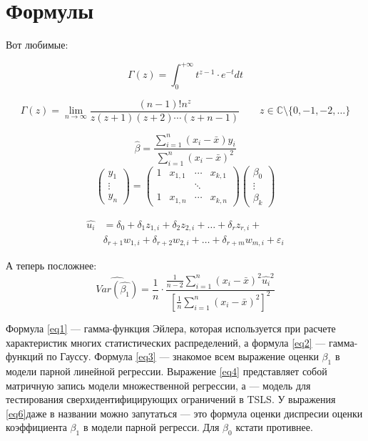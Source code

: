 \documentclass[12pt,a4paper]{article}
\def\C{\ensuremath{\mathbb{C}{}}}
\begin{document}
\section{Формулы}
Вот любимые:

\begin{equation}\label{eq1}
\Gamma (z) = \int_{0}^{+\infty} t^{z-1} \cdot e^{-t} dt  \tag{\ae}
\end{equation}

\begin{equation}\label{eq2}
\Gamma (z) =  \lim\limits_{n\to\infty} \frac{(n-1)!n^z}{z(z+1)(z+2)\cdots(z+n-1)} \qquad z \in \C \setminus \{0,-1,-2, \dots \} \tag{\ae\ae}
\end{equation}

\begin{equation}\label{eq3}
\hat{\beta} = \frac{\sum_{i=1}^{n}(x_i-\bar{x})y_i}{\sum_{i=1}^{n}(x_i-\bar{x})^2}  \tag{\ae\ae\ae}
\end{equation}
\begin{equation}\label{eq4}
 \begin{pmatrix}
y_1 \\
\vdots \\
y_n
 \end{pmatrix} =
 \begin{pmatrix}
 1 & x_{1,1} &\cdots & x_{k,1}\\
 && \ddots & \\
 1 & x_{1,n} &\cdots & x_{k,n}
 \end{pmatrix}
 \begin{pmatrix}
 \beta_0 \\
 \vdots \\
 \beta_k
 \end{pmatrix} \tag{\ae\ae\ae\ae}
\end{equation}

\label{eq5}
  \begin{align}
\hat{u_i} &=\delta_0+\delta_1 z_{1,i} + \delta_2 z_{2,i}+ \ldots + \delta_r z_{r,i}+ \\
& \delta_{r+1} w_{1,i} + \delta_{r+2} w_{2,i} + \ldots + \delta_{r+m} w_{m,i} +\varepsilon_i  \label{eq5}
 \tag{\ae\ae\ae\ae\ae}
  \end{align} 


А теперь посложнее:\\
\begin{equation}\label{eq6}
\widehat {Var(\hat{\beta_1})} = \frac{1}{n} \cdot \frac{ \frac{1}{n-2}  \sum_{i=1}^{n} (x_i-\bar{x})^2 \hat{u_i}^2} { [\frac{1}{n} \sum_{i=1}^{n}(x_i-\bar{x})^2]^2} \tag{\ae\ae\ae\ae\ae\ae}
\end{equation}

Формула \eqref{eq1} --- гамма-функция Эйлера, которая используется при расчете характеристик многих статистических распределений, а формула \eqref{eq2} --- гамма-функций по Гауссу. Формула \eqref{eq3} --- знакомое всем выражение оценки $\beta_1$ в модели парной линейной регрессии. Выражение \eqref{eq4} представляет собой матричную запись модели множественной регрессии, а  --- модель для тестирования сверхидентифицирующих ограничений в TSLS. У выражения \eqref{eq6}даже в названии можно запутаться --- это формула оценки диспресии оценки коэффициента $\beta_1$ в модели парной регресси. Для $\beta_0$ кстати противнее. 
\end{document}
